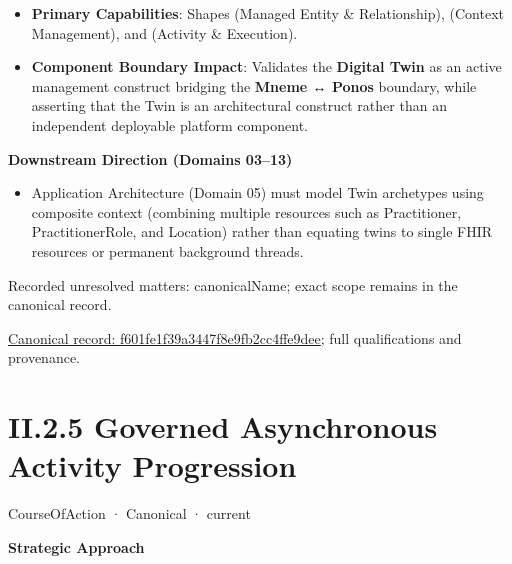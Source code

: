 \begin{itemize}


\item \textbf{Primary Capabilities}: Shapes \texttt{} (Managed Entity \& Relationship), \texttt{} (Context Management), and \texttt{} (Activity \& Execution).

\item \textbf{Component Boundary Impact}: Validates the \textbf{Digital Twin} as an active management construct bridging the \textbf{Mneme ↔ Ponos} boundary, while asserting that the Twin is an architectural construct rather than an independent deployable platform component.

\end{itemize}


\par\medskip\textbf{Downstream Direction (Domains 03–13)}\par


\begin{itemize}


\item Application Architecture (Domain 05) must model Twin archetypes using composite context (combining multiple resources such as Practitioner, PractitionerRole, and Location) rather than equating twins to single FHIR resources or permanent background threads.

\end{itemize}

{\small Recorded unresolved matters: canonicalName; exact scope remains in the canonical record.}\par
{\footnotesize \href{../../../../continuum/strategy/course-of-action/f601fe1f39a3447f8e9fb2cc4ffe9dee.md}{Canonical record: f601fe1f39a3447f8e9fb2cc4ffe9dee}; full qualifications and provenance.}\par
\section*{II.2.5 Governed Asynchronous Activity Progression}
\label{navigation:II.2.5}

\label{element:a8ab09ee29454376bd45ba90b320d6ec}
{\small CourseOfAction · Canonical · current}\par

\par\medskip\textbf{Strategic Approach}\par


